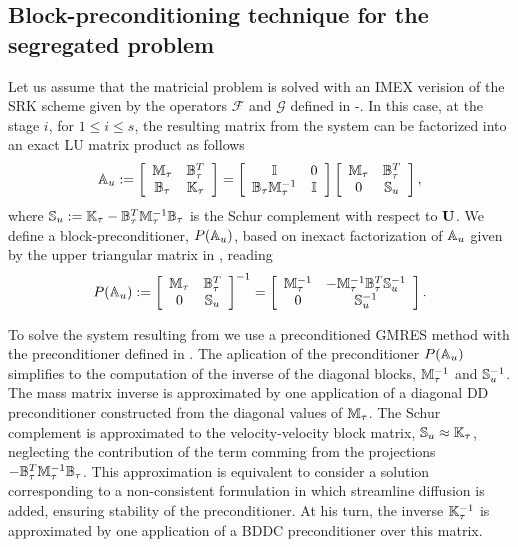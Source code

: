 \subsection{Block-preconditioning technique for the segregated problem}
Let us assume that the matricial problem  is solved with an IMEX verision of the SRK scheme given by the operators $ \mathcal{F} $ and $ \mathcal{G} $ defined in -. In this case, at the stage $ i $, for $ 1\le i \le s $, the resulting matrix from the system  can be factorized into an exact LU matrix product as follows
\begin{equation}
\label{eq-C7_SRK_u_mat}
\mathbb{A}_u:=\left[\begin{array}{cc}
\mathbb{M}_\tau&\mathbb{B}_\tau^T\\
\mathbb{B}_\tau&\mathbb{K}_\tau
\end{array}\right]=\left[\begin{array}{cc}
\mathbb{I}&0\\
\mathbb{B}_\tau\mathbb{M}_\tau^{-1}&\mathbb{I}
\end{array}\right]\left[\begin{array}{cc}
\mathbb{M}_\tau&\mathbb{B}_\tau^T\\
0&\mathbb{S}_u
\end{array}\right],
\end{equation}
where $ \mathbb{S}_u:=\mathbb{K}_\tau-\mathbb{B}_\tau^T\mathbb{M}_\tau^{-1}\mathbb{B}_\tau$ is the Schur complement with respect to ${\bf U}$. We define a block-preconditioner, $ P(\mathbb{A}_u) $, based on inexact factorization of $ \mathbb{A}_u $ given by the upper triangular matrix in , reading
\begin{equation}
\label{eq-C7_SRK_u_prec}
P(\mathbb{A}_u):=\left[\begin{array}{cc}
\mathbb{M}_\tau&\mathbb{B}_\tau^T\\
0&\mathbb{S}_u
\end{array}\right]^{-1}=\left[\begin{array}{cc}
\mathbb{M}_\tau^{-1}&-\mathbb{M}_\tau^{-1}\mathbb{B}_\tau^T\mathbb{S}_u^{-1}\\
0&\mathbb{S}_u^{-1}
\end{array}\right].
\end{equation}

To solve the system resulting from  we use a preconditioned GMRES method with the preconditioner defined in . The aplication of the preconditioner $ P(\mathbb{A}_u) $ simplifies to the computation of the inverse of the diagonal blocks, $ \mathbb{M}_\tau^{-1} $ and $ \mathbb{S}_u^{-1} $. The mass matrix inverse is approximated by one application of a diagonal DD preconditioner constructed from the diagonal values of $ \mathbb{M}_\tau $. The Schur complement is approximated to the velocity-velocity block matrix, $ \mathbb{S}_u\approx\mathbb{K}_\tau $, neglecting the contribution of the term comming from the projections $ -\mathbb{B}_\tau^T\mathbb{M}_\tau^{-1}\mathbb{B}_\tau $. This approximation is equivalent to consider a solution corresponding to a non-consistent formulation in which streamline diffusion is added, ensuring stability of the preconditioner. At his turn, the inverse $ \mathbb{K}_\tau^{-1} $ is approximated by one application of a BDDC preconditioner over this matrix.

